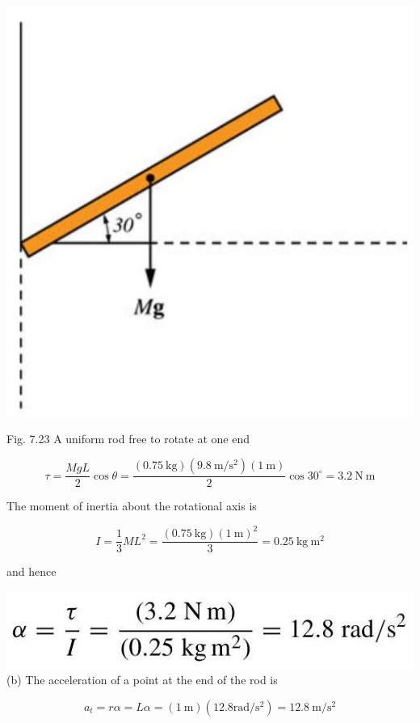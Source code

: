 \documentclass[10pt]{article}
\begin{document}
\begin{center}
\includegraphics[max width=\textwidth]{2024_09_13_db1f357d2aad0a03eb2eg-124(1)}
\end{center}

Fig. 7.23 A uniform rod free to rotate at one end

$$
\tau=\frac{M g L}{2} \cos \theta=\frac{(0.75 \mathrm{~kg})\left(9.8 \mathrm{~m} / \mathrm{s}^{2}\right)(1 \mathrm{~m})}{2} \cos 30^{\circ}=3.2 \mathrm{~N} \mathrm{~m}
$$

The moment of inertia about the rotational axis is

$$
I=\frac{1}{3} M L^{2}=\frac{(0.75 \mathrm{~kg})(1 \mathrm{~m})^{2}}{3}=0.25 \mathrm{~kg} \mathrm{~m}^{2}
$$

and hence

\includegraphics[max width=\textwidth, center]{2024_09_13_db1f357d2aad0a03eb2eg-124}\\
(b) The acceleration of a point at the end of the rod is

$$
a_{t}=r \alpha=L \alpha=(1 \mathrm{~m})\left(12.8 \mathrm{rad} / \mathrm{s}^{2}\right)=12.8 \mathrm{~m} / \mathrm{s}^{2}
$$
\end{document}
